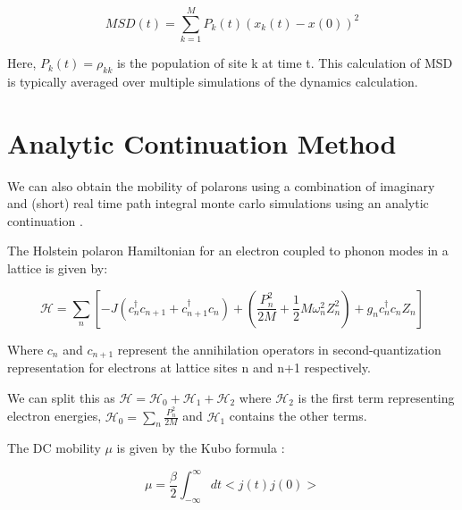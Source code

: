 \begin{equation}
    MSD(t) = \sum_{k=1}^{M} P_{k}(t) (x_{k}(t) - x(0))^2
\end{equation}

Here, $P_k(t) = \rho_{kk}$ is the population of site k at time t. This calculation of MSD is typically averaged over multiple simulations of the dynamics calculation.



\section{Analytic Continuation Method}

We can also obtain the mobility of polarons using a combination of imaginary and (short) real time path integral monte carlo simulations using an analytic continuation \cite{miladic2023method}. 

 The Holstein polaron Hamiltonian for an electron coupled to phonon modes in a lattice is given by:

 \begin{equation}
    \mathcal{H} = \sum_n [-J(c_n^{\dag} c_{n+1} + c_{n+1}^{\dag}c_{n}) + (\frac{P_n^{2}}{2M} + \frac{1}{2}M\omega_n^{2} Z_{n}^{2}) + g_n c_n^{\dag}c_n Z_n]
 \end{equation}

 Where $c_n$ and $c_{n+1}$ represent the annihilation operators in second-quantization representation for electrons at lattice sites n and n+1 respectively.

 We can split this as $\mathcal{H} = \mathcal{H}_0 + \mathcal{H}_1 + \mathcal{H}_2$ where $\mathcal{H}_2$ is the first term representing electron energies, $\mathcal{H}_0 = \sum_n \frac{P_n^2}{2M}$ and $\mathcal{H}_1$ contains the other terms.

 The DC mobility $\mu$ is given by the Kubo formula :

 \begin{equation}
    \mu = \frac{\beta}{2} \int_{-\infty}^{\infty} dt<j(t)j(0)>
 \end{equation}

